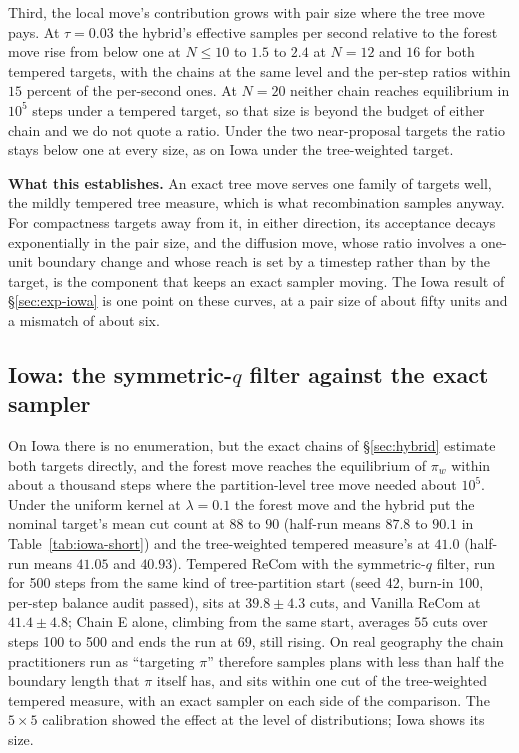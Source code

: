 \documentclass[11pt]{article}
\begin{document}
Third, the local move's contribution grows with pair size where the
tree move pays. At $\tau = 0.03$ the hybrid's effective samples per
second relative to the forest move rise from below one at $N \le 10$
to $1.5$ to $2.4$ at $N = 12$ and $16$ for both tempered targets, with
the chains at the same level and the per-step ratios within $15$
percent of the per-second ones. At $N = 20$ neither chain reaches
equilibrium in $10^5$ steps under a tempered target, so that size is
beyond the budget of either chain and we do not quote a ratio. Under
the two near-proposal targets the ratio stays below one at every
size, as on Iowa under the tree-weighted target.

\textbf{What this establishes.} An exact tree move serves one family
of targets well, the mildly tempered tree measure, which is what
recombination samples anyway. For compactness targets away from it,
in either direction, its acceptance decays exponentially in the pair
size, and the diffusion move, whose ratio involves a one-unit boundary
change and whose reach is set by a timestep rather than by the
target, is the component that keeps an exact sampler moving. The Iowa
result of \S\ref{sec:exp-iowa} is one point on these curves, at a
pair size of about fifty units and a mismatch of about six.

\subsection{Iowa: the symmetric-\texorpdfstring{$q$}{q} filter against the exact sampler}\label{sec:exp-iowa-calib}

On Iowa there is no enumeration, but the exact chains of
\S\ref{sec:hybrid} estimate both targets directly, and the forest
move reaches the equilibrium of $\pi_w$ within about a thousand steps
where the partition-level tree move needed about $10^5$. Under the
uniform kernel at $\lambda = 0.1$ the forest move and the hybrid put
the nominal target's mean cut count at $88$ to $90$ (half-run means
$87.8$ to $90.1$ in Table~\ref{tab:iowa-short}) and the tree-weighted
tempered measure's at $41.0$ (half-run means $41.05$ and $40.93$).
Tempered ReCom with the symmetric-$q$ filter, run for 500 steps from
the same kind of tree-partition start (seed 42, burn-in 100, per-step
balance audit passed), sits at $39.8 \pm 4.3$ cuts, and Vanilla ReCom
at $41.4 \pm 4.8$; Chain E alone, climbing from the same start,
averages $55$ cuts over steps 100 to 500 and ends the run at $69$,
still rising. On real geography the chain practitioners run as
``targeting $\pi$'' therefore samples plans with less than half the
boundary length that $\pi$ itself has, and sits within one cut of the
tree-weighted tempered measure, with an exact sampler on each side of
the comparison. The $5 \times 5$ calibration showed the effect at the
level of distributions; Iowa shows its size.
\end{document}
